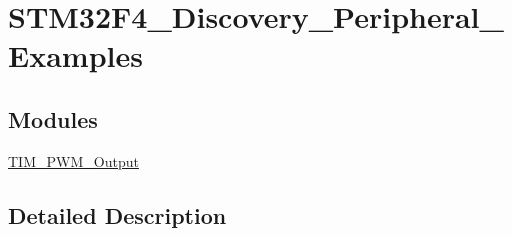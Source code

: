 \hypertarget{group___s_t_m32_f4___discovery___peripheral___examples}{}\section{S\+T\+M32\+F4\+\_\+\+Discovery\+\_\+\+Peripheral\+\_\+\+Examples}
\label{group___s_t_m32_f4___discovery___peripheral___examples}
\subsection*{Modules}
\begin{DoxyCompactItemize}
\item 
\hyperlink{group___t_i_m___p_w_m___output}{T\+I\+M\+\_\+\+P\+W\+M\+\_\+\+Output}
\end{DoxyCompactItemize}


\subsection{Detailed Description}
